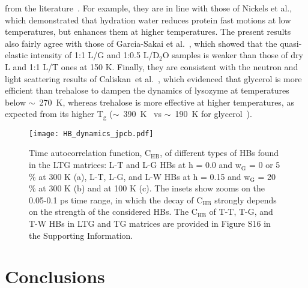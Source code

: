 \documentclass[journal=jpcbfk,manuscript=article]{achemso}
\begin{document}
\begin{singlespacing}
from the literature~\cite{Nickels2012,Sakai2013,Caliskan2004}. For example, they are in line with those of Nickels et al., 
which demonstrated that hydration water reduces protein fast motions at low temperatures, but enhances them at higher 
temperatures. The present results also fairly agree with those of Garcia-Sakai et al.~\cite{Sakai2013}, which showed that 
the quasi-elastic intensity of 1:1 L/G and 1:0.5 L/D$_{\textrm{2}}$O samples is weaker than those of dry L and 1:1 L/T 
ones at 150 K. Finally, they are consistent with the neutron and light scattering results of 
Caliskan~et al.~\cite{Caliskan2004}, which evidenced that glycerol is more efficient than trehalose to dampen 
the dynamics of lysozyme at temperatures below $\sim$~270~K, whereas trehalose is more effective at higher temperatures,
as expected from its higher T$_{\textrm{g}}$ ($\sim$~390~K~\cite{Miller2000,Cicerone2004,Weng2015} 
vs $\sim$~190~K for glycerol~\cite{Bohmer1993,Hempel2000}).

\begin{figure}[htbp]
\texttt{[image: HB\_dynamics\_jpcb.pdf]}
\caption{\label{hb_dynamics}
Time autocorrelation function, C$_{\textrm{HB}}$, of different types of HBs found in the LTG matrices: 
L-T and L-G HBs at h = 0.0 and w$_{\textrm{G}}$ = 0 or 5 \% at 300 K (a), L-T, L-G, and L-W HBs at h = 0.15 
and w$_{\textrm{G}}$ = 20 \% at 300 K (b) and at 100 K (c). The insets show zooms on the 0.05-0.1 ps 
time range, in which the decay of C$_{\textrm{HB}}$ strongly depends on the strength of the considered HBs.
The C$_{\textrm{HB}}$ of T-T, T-G, and T-W HBs in LTG and TG matrices are provided in Figure S16 
in the Supporting Information.
}
\end{figure}


\newpage

\section{Conclusions}


\end{singlespacing}
\end{document}
